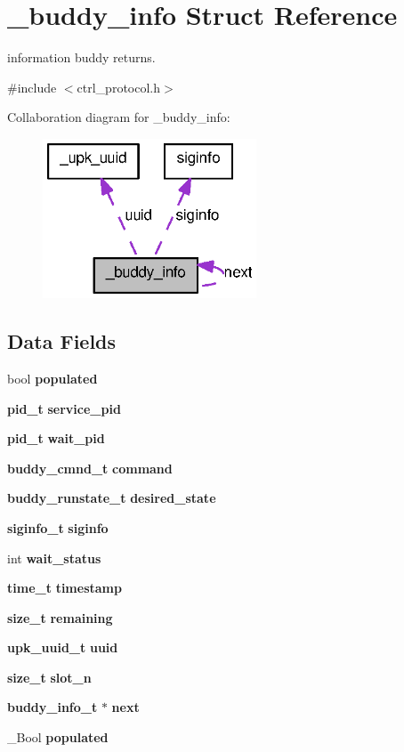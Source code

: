 \section{\_\-buddy\_\-info Struct Reference}
\label{struct__buddy__info}


information buddy returns.  




{\ttfamily \#include $<$ctrl\_\-protocol.h$>$}



Collaboration diagram for \_\-buddy\_\-info:
\nopagebreak
\begin{figure}[H]
\begin{center}
\leavevmode
\includegraphics[width=180pt]{struct__buddy__info__coll__graph}
\end{center}
\end{figure}
\subsection*{Data Fields}
\begin{DoxyCompactItemize}
\item 
bool {\bf populated}
\item 
{\bf pid\_\-t} {\bf service\_\-pid}
\item 
{\bf pid\_\-t} {\bf wait\_\-pid}
\item 
{\bf buddy\_\-cmnd\_\-t} {\bf command}
\item 
{\bf buddy\_\-runstate\_\-t} {\bf desired\_\-state}
\item 
{\bf siginfo\_\-t} {\bf siginfo}
\item 
int {\bf wait\_\-status}
\item 
{\bf time\_\-t} {\bf timestamp}
\item 
{\bf size\_\-t} {\bf remaining}
\item 
{\bf upk\_\-uuid\_\-t} {\bf uuid}
\item 
{\bf size\_\-t} {\bf slot\_\-n}
\item 
{\bf buddy\_\-info\_\-t} $\ast$ {\bf next}
\item 
\_\-Bool {\bf populated}
\end{DoxyCompactItemize}


